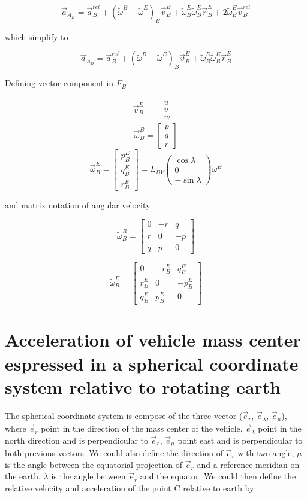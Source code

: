 \documentclass[10pt]{article}
\newcommand{\er}{\vec{e}_r}
\newcommand{\el}{\vec{e}_\lambda}
\newcommand{\eu}{\vec{e}_\mu}
\begin{document}
$$\vec{a}_{A_B} = \vec{a}^{rel}_B + (\tilde{\omega}^B -
\tilde{\omega}^E)_B\vec{v}^E_B +
\tilde{\omega}^E_B\tilde{\omega}^E_B\vec{r}^E_B +
2\tilde{\omega}^E_B\vec{v}^{rel}_B$$ 

which simplify to

$$\vec{a}_{A_B} = \vec{a}^{rel}_B + (\tilde{\omega}^B +
\tilde{\omega}^E)_B\vec{v}^E_B +
\tilde{\omega}^E_B\tilde{\omega}^E_B\vec{r}^E_B$$ 


Defining vector component in $F_B$

$$\vec{v}^E_B = \begin{bmatrix}u\\v\\w\end{bmatrix}$$
$$\vec{\omega}^B_B = \begin{bmatrix}p\\q\\r\end{bmatrix}$$
$$\vec{\omega}^E_B = \begin{bmatrix}p^E_B\\q^E_B\\r^E_B\end{bmatrix} =
L_{BV}\begin{pmatrix}\cos{\lambda}\\0\\-\sin{\lambda}\end{pmatrix}\omega^E$$

and matrix notation of angular velocity

$$\tilde{\omega}^B_B =
\begin{bmatrix}0&-r&q\\r&0&-p\\q&p&0\end{bmatrix}$$

$$\tilde{\omega}^E_B =
\begin{bmatrix}0&-r^E_B&q^E_B\\r^E_B&0&-p^E_B\\q^E_B&p^E_B&0\end{bmatrix}$$


\section{Acceleration of vehicle mass center espressed in a spherical
coordinate system relative to rotating earth}

The spherical coordinate system is compose of the three vector
($\er$, $\el$, $\eu$), where $\er$ point in the direction of the mass
center of the vehicle, $\el$ point in the north direction and is
perpendicular to $\er$, $\eu$ point east and is perpendicular to both
previous vectors. We could also define the direction of $\er$ with two
angle, $\mu$ is the angle between the equatorial projection of $\er$
and a reference meridian on the earth. $\lambda$ is the angle between
$\er$ and the equator. We could then define the relative velocity and
acceleration of the point C relative to earth by:
\end{document}
